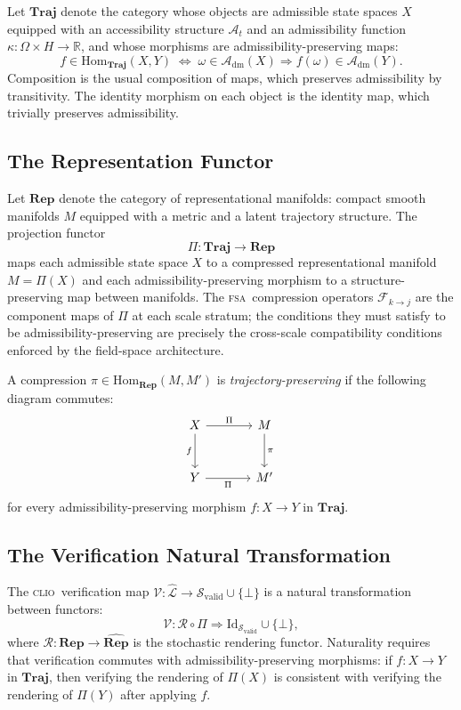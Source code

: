 \documentclass[11pt,a4paper]{article}
\theoremstyle{plain}
\theoremstyle{definition}
\theoremstyle{remark}
\newcommand{\A}{\mathcal{A}}
\newcommand{\Svalid}{\mathcal{S}_{\mathrm{valid}}}
\newcommand{\Adm}{\mathcal{A}_{\mathrm{dm}}}
\newcommand{\CLIO}{\textup{\textsc{clio}}}
\newcommand{\FSA}{\textup{\textsc{fsa}}}
\newcommand{\Omg}{\Omega}
\begin{document}
Let $\mathbf{Traj}$ denote the category whose objects are admissible state
spaces $X$ equipped with an accessibility structure $\A_t$ and an
admissibility function $\kappa: \Omg \times H \to \mathbb{R}$, and whose
morphisms are admissibility-preserving maps:
\[
f \in \mathrm{Hom}_{\mathbf{Traj}}(X, Y)
\;\Longleftrightarrow\;
\omega \in \Adm(X) \Rightarrow f(\omega) \in \Adm(Y).
\]
Composition is the usual composition of maps, which preserves
admissibility by transitivity. The identity morphism on each object is the
identity map, which trivially preserves admissibility.

\subsection*{The Representation Functor}

Let $\mathbf{Rep}$ denote the category of representational manifolds:
compact smooth manifolds $M$ equipped with a metric and a latent
trajectory structure. The projection functor
\[
\Pi: \mathbf{Traj} \to \mathbf{Rep}
\]
maps each admissible state space $X$ to a compressed representational
manifold $M = \Pi(X)$ and each admissibility-preserving morphism to a
structure-preserving map between manifolds. The \FSA\ compression
operators $\mathcal{F}_{k \to j}$ are the component maps of $\Pi$ at
each scale stratum; the conditions they must satisfy to be
admissibility-preserving are precisely the cross-scale compatibility
conditions enforced by the field-space architecture.

A compression $\pi \in \mathrm{Hom}_{\mathbf{Rep}}(M, M')$ is
\textit{trajectory-preserving} if the following diagram commutes:
\[
\begin{tikzcd}[column sep=large, row sep=large]
X \arrow[r, "\Pi"] \arrow[d, "f"'] & M \arrow[d, "\pi"] \\
Y \arrow[r, "\Pi"'] & M'
\end{tikzcd}
\]
for every admissibility-preserving morphism $f: X \to Y$ in $\mathbf{Traj}$.

\subsection*{The Verification Natural Transformation}

The \CLIO\ verification map $\mathcal{V}: \widehat{\mathcal{L}} \to
\Svalid \cup \{\bot\}$ is a natural transformation between functors:
\[
\mathcal{V}: \mathcal{R} \circ \Pi \Rightarrow \mathrm{Id}_{\Svalid}
\cup \{\bot\},
\]
where $\mathcal{R}: \mathbf{Rep} \to \widehat{\mathbf{Rep}}$ is the
stochastic rendering functor. Naturality requires that verification
commutes with admissibility-preserving morphisms: if $f: X \to Y$ in
$\mathbf{Traj}$, then verifying the rendering of $\Pi(X)$ is consistent
with verifying the rendering of $\Pi(Y)$ after applying $f$.
\end{document}
